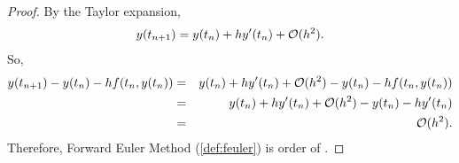 \documentclass[12pt]  {article}%
\begin{document}
\begin{proof}
By the Taylor expansion,
 \begin{eqnarray}\label{eqn:feulertay}
 y(t_{n+1})=y(t_n)+hy'(t_n)+\mathcal{O}{(h^2)}.
\end{eqnarray}
So,
 \begin{eqnarray}\label{eqn:feulerdiff1}
 y(t_{n+1})-y(t_n)-h f(t_n,y(t_{n}))&=&y(t_n)+hy'(t_n)+\mathcal{O}{(h^2)}-y(t_n)-h f(t_n,y(t_{n}))\nonumber\\
 &=&y(t_n)+hy'(t_n)+\mathcal{O}{(h^2)}-y(t_n)-h y'(t_n)\\
 &=&\mathcal{O}{(h^2)}\nonumber.
\end{eqnarray}
Therefore, Forward Euler Method (\ref{def:feuler}) is order of .
\end{proof}
\end{document}
